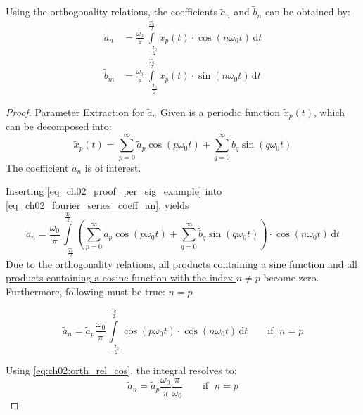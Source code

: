 \begin{refsection}
Using the orthogonality relations, the coefficients $\tilde{a}_n$ and $\tilde{b}_n$ can be obtained by:
\begin{subequations}
	\begin{align}
		\tilde{a}_n &= \frac{\omega_0}{\pi} \int\limits_{-\frac{T_0}{2}}^{\frac{T_0}{2}} \tilde{x}_p(t) \cdot \cos\left(n \omega_0 t\right) \, \mathrm{d} t \label{eq_ch02_fourier_series_coeff_an} \\
		\tilde{b}_m &= \frac{\omega_0}{\pi} \int\limits_{-\frac{T_0}{2}}^{\frac{T_0}{2}} \tilde{x}_p(t) \cdot \sin\left(n \omega_0 t\right) \, \mathrm{d} t \label{eq_ch02_fourier_series_coeff_bm}
	\end{align}
\end{subequations}

\begin{proof}{Parameter Extraction for $\tilde{a}_n$}
	Given is a periodic function $\tilde{x}_p(t)$, which can be decomposed into:
	\begin{equation}
		\tilde{x}_p(t) = \sum\limits_{p=0}^{\infty} \tilde{a}_p \cos\left(p \omega_0 t\right) + \sum\limits_{q=0}^{\infty} \tilde{b}_q \sin\left(q \omega_0 t\right)
		\label{eq_ch02_proof_per_sig_example}
	\end{equation}
	The coefficient $\tilde{a}_n$ is of interest.
	
	Inserting \eqref{eq_ch02_proof_per_sig_example} into \eqref{eq_ch02_fourier_series_coeff_an}, yields
	\begin{equation}
		\tilde{a}_n = \frac{\omega_0}{\pi} \int\limits_{-\frac{T_0}{2}}^{\frac{T_0}{2}} \left(\sum\limits_{p=0}^{\infty} \tilde{a}_p \cos\left(p \omega_0 t\right) + \sum\limits_{q=0}^{\infty} \tilde{b}_q \sin\left(q \omega_0 t\right)\right) \cdot \cos\left(n \omega_0 t\right) \, \mathrm{d} t
	\end{equation}
	Due to the orthogonality relations, \underline{all products containing a sine function} and \underline{all products containing a cosine function with the index $n \neq p$} become zero. Furthermore, following must be true: $n = p$
	
	\begin{equation}
		\tilde{a}_n = \tilde{a}_p \frac{\omega_0}{\pi} \int\limits_{-\frac{T_0}{2}}^{\frac{T_0}{2}} \cos\left(p \omega_0 t\right) \cdot \cos\left(n \omega_0 t\right) \, \mathrm{d} t \qquad \text{if } \; n = p
	\end{equation}
	
	Using \eqref{eq:ch02:orth_rel_cos}, the integral resolves to:
	\begin{equation}
		\tilde{a}_n = \tilde{a}_p \frac{\omega_0}{\pi} \frac{\pi}{\omega_0} \qquad \text{if } \; n = p
	\end{equation}
	

\end{proof}
\end{refsection}
